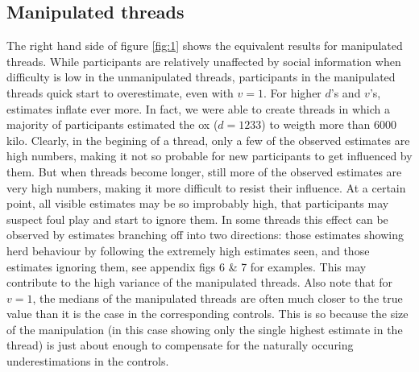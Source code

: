 \documentclass[10pt,a4paper,twocolumn,lineno]{article}
\begin{document}
\subsection{Manipulated threads}
The right hand side of figure \ref{fig:1} shows the equivalent results for manipulated threads. While participants are relatively unaffected by social information when difficulty is low in the unmanipulated threads, participants in the manipulated threads quick start to overestimate, even with $v=1$. For higher $d$'s and $v$'s, estimates inflate ever more. In fact, we were able to create threads in which a majority of participants estimated the ox ($d=1233$) to weigth more than 6000 kilo. Clearly, in the begining of a thread, only a few of the observed estimates are high numbers, making it not so probable for new participants to get influenced by them. But when threads become longer, still more of the observed estimates are very high numbers, making it more difficult to resist their influence. At a certain point, all visible estimates may be so improbably high, that participants may suspect foul play and start to ignore them. In some threads this effect can be observed by estimates branching off into two directions: those estimates showing herd behaviour by following the extremely high estimates seen, and those estimates ignoring them, see appendix figs 6 \& 7 for examples. This may contribute to the high variance of the manipulated threads. Also note that for $v=1$, the medians of the manipulated threads are often much closer to the true value than it is the case in the corresponding controls. This is so because the size of the manipulation (in this case showing only the single highest estimate in the thread) is just about enough to compensate for the naturally occuring underestimations in the controls.
\end{document}
